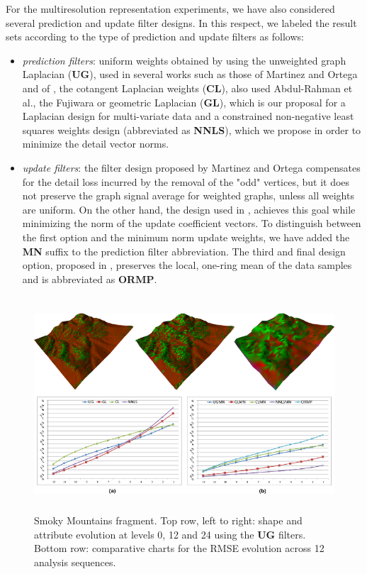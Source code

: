 \documentclass[graybox]{svmult}
\begin{document}
For the multiresolution representation experiments, we have also considered several prediction and update filter designs. In this respect, we labeled the result sets according to the type of prediction and update filters as follows:
\begin{itemize}
	\item{\emph{prediction filters}}: uniform weights obtained by using the unweighted graph Laplacian (\textbf{UG}), used in several works such as those of Martinez and Ortega \cite{Martinez2011} and of \cite{AbdulRahman2013}, the cotangent Laplacian weights (\textbf{CL}), also used Abdul-Rahman et al., the Fujiwara or geometric Laplacian (\textbf{GL}), which is our proposal for a Laplacian design for multi-variate data and a constrained  non-negative least squares weights design (abbreviated as \textbf{NNLS}), which we propose in order to minimize the detail vector norms.
	\item{\emph{update filters}}: the filter design proposed by Martinez and Ortega \cite{Martinez2011} compensates for the detail loss incurred by the removal of the "odd" vertices, but it does not preserve the graph signal average for weighted graphs, unless all weights are uniform. On the other hand, the design used in \cite{Jansen2001,Wagner2005}, achieves this goal while minimizing the norm of the update coefficient vectors. To distinguish between the first option and the minimum norm update weights, we have added the \textbf{MN} suffix to the prediction filter abbreviation. The third and final design option, proposed in \cite{AbdulRahman2013}, preserves the local, one-ring mean of the data samples  and is abbreviated as \textbf{ORMP}.
\end{itemize}

\begin{figure}[!htbp]
	\centering
	\includegraphics[height=8cm]{smokey_lod_rmse.pdf}
	
	\caption{\label{fig_cds:smokey_lod_rmse}%
		Smoky Mountains fragment. Top row, left to right: shape and attribute evolution at levels 0, 12 and 24 using the \textbf{UG} filters. Bottom row: comparative charts for the RMSE evolution across 12 analysis sequences. }
\end{figure}
\end{document}
